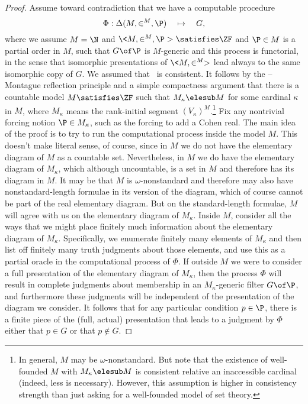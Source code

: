 \documentclass{amsart}
\begin{document}
\begin{proof}
Assume toward contradiction that we have a computable procedure
$$\Phi:\Delta(M,\in^M,\P)\quad\mapsto\quad G,$$
where we assume $M=\N$ and $\<M,\in^M,\P>\satisfies\ZF$ and $\P\in M$ is a partial order in $M$, such that $G\of\P$ is $M$-generic and this process is functorial, in the sense that isomorphic presentations of $\<M,\in^M>$ lead always to the same isomorphic copy of $G$.
We assumed that \ZF\ is consistent. It follows by the \Levy--Montague reflection principle and a simple compactness argument that there is a countable model $M\satisfies\ZF$ such that $M_\kappa\elesub M$ for some cardinal $\kappa$ in $M$, where $M_\kappa$ means the rank-initial segment $(V_\kappa)^M$.\footnote{In general, $M$ may be $\omega$-nonstandard. But note that the existence of well-founded $M$ with $M_\kappa \elesub M$ is consistent relative an inaccessible cardinal (indeed, less is necessary). However, this assumption is higher in consistency strength than just asking for a well-founded model of set theory.}
Fix any nontrivial forcing notion $\P\in M_\kappa$, such as the forcing to add a Cohen real.
The main idea of the proof is to try to run the computational process inside the model $M$. This doesn't make literal sense, of course, since in $M$ we do not have the elementary diagram of $M$ as a countable set. Nevertheless, in $M$ we do have the elementary diagram of $M_\kappa$, which although uncountable, is a set in $M$ and therefore has its diagram in $M$. It may be that $M$ is $\omega$-nonstandard and therefore may also have nonstandard-length formulae in its version of the diagram, which of course cannot be part of the real elementary diagram. But on the standard-length formulae, $M$ will agree with us on the elementary diagram of $M_\kappa$.
Inside $M$, consider all the ways that we might place finitely much information about the elementary diagram of $M_\kappa$. Specifically, we enumerate finitely many elements of $M_\kappa$ and then list off finitely many truth judgments about those elements, and use this as a partial oracle in the computational process of $\Phi$.
If outside $M$ we were to consider a full presentation of the elementary diagram of $M_\kappa$, then the process $\Phi$ will result in complete judgments about membership in an $M_\kappa$-generic filter $G\of\P$, and furthermore these judgments will be independent of the presentation of the diagram we consider. It follows that for any particular condition $p\in\P$, there is a finite piece of the (full, actual) presentation that leads to a judgment by $\Phi$ either that $p\in G$ or that $p\notin G$.

\end{proof}
\end{document}
